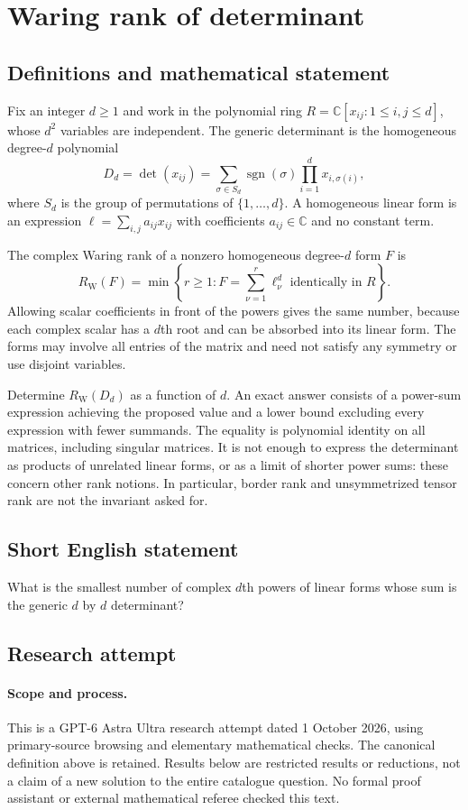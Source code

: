 \documentclass[11pt,a4paper]{article}
\begin{document}
\section*{Waring rank of determinant}\label{statement}

\subsection{Definitions and mathematical statement}
Fix an integer $d\ge1$ and work in the polynomial ring
$R=\mathbb C[x_{ij}:1\le i,j\le d]$, whose $d^2$ variables are independent.
The generic determinant is the homogeneous degree-$d$ polynomial
\[
 D_d=\det(x_{ij})=
 \sum_{\sigma\in S_d}\operatorname{sgn}(\sigma)
       \prod_{i=1}^d x_{i,\sigma(i)},
\]
where $S_d$ is the group of permutations of $\{1,\ldots,d\}$.
A homogeneous linear form is an expression
$\ell=\sum_{i,j}a_{ij}x_{ij}$ with coefficients $a_{ij}\in\mathbb C$ and no
constant term.

The complex Waring rank of a nonzero homogeneous degree-$d$ form $F$ is
\[
 R_{\mathrm W}(F)=\min\left\{r\ge1:
 F=\sum_{\nu=1}^r\ell_\nu^d\text{ identically in }R\right\}.
\]
Allowing scalar coefficients in front of the powers gives the same number,
because each complex scalar has a $d$th root and can be absorbed into its
linear form. The forms may involve all entries of the matrix and need not
satisfy any symmetry or use disjoint variables.

Determine $R_{\mathrm W}(D_d)$ as a function of $d$. An exact answer consists
of a power-sum expression achieving the proposed value and a lower bound
excluding every expression with fewer summands. The equality is polynomial
identity on all matrices, including singular matrices. It is not enough to
express the determinant as products of unrelated linear forms, or as a
limit of shorter power sums: these concern other rank notions. In particular,
border rank and unsymmetrized tensor rank are not the invariant asked for.
\subsection{Short English statement}
What is the smallest number of complex $d$th powers of linear forms whose sum is the generic $d$ by $d$ determinant?
\subsection{Research attempt}
\paragraph{Scope and process.}
This is a GPT-6 Astra Ultra research attempt dated 1 October 2026, using
primary-source browsing and elementary mathematical checks. The canonical
definition above is retained. Results below are restricted results or
reductions, not a claim of a new solution to the entire catalogue question.
No formal proof assistant or external mathematical referee checked this text.
\end{document}
